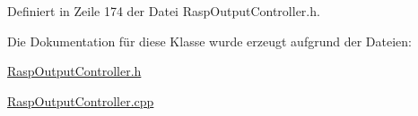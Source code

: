 Definiert in Zeile 174 der Datei Rasp\+Output\+Controller.\+h.



Die Dokumentation für diese Klasse wurde erzeugt aufgrund der Dateien\+:\begin{DoxyCompactItemize}
\item 
\hyperlink{_rasp_output_controller_8h}{Rasp\+Output\+Controller.\+h}\item 
\hyperlink{_rasp_output_controller_8cpp}{Rasp\+Output\+Controller.\+cpp}\end{DoxyCompactItemize}
